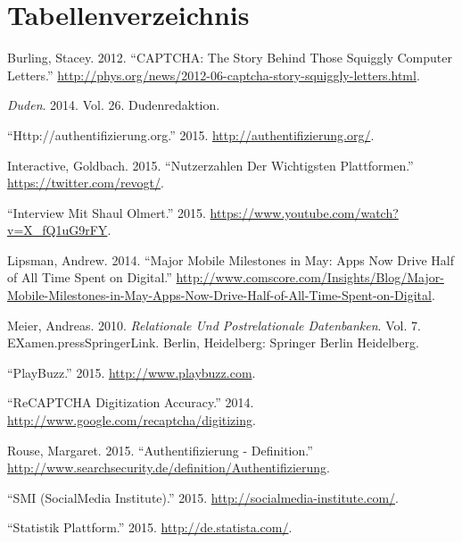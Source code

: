 \renewcommand{\bibname}{}

\begingroup \let\clearpage\relax

\endgroup

\pagebreak

\section{Tabellenverzeichnis}\label{tabellenverzeichnis}

\renewcommand{\listtablename}{} 

\begingroup \let\clearpage\relax
\listoftables
\endgroup

\hypertarget{refs}{}
\hypertarget{ref-captcha}{}
Burling, Stacey. 2012. ``CAPTCHA: The Story Behind Those Squiggly
Computer Letters.''
\url{http://phys.org/news/2012-06-captcha-story-squiggly-letters.html}.

\hypertarget{ref-duden}{}
\emph{Duden}. 2014. Vol. 26. Dudenredaktion.

\hypertarget{ref-authentifizierungsdeforg}{}
``Http://authentifizierung.org.'' 2015.
\url{http://authentifizierung.org/}.

\hypertarget{ref-goldbachsocial}{}
Interactive, Goldbach. 2015. ``Nutzerzahlen Der Wichtigsten
Plattformen.'' \url{https://twitter.com/revogt/}.

\hypertarget{ref-t3nplaybuzz}{}
``Interview Mit Shaul Olmert.'' 2015.
\url{https://www.youtube.com/watch?v=X_fQ1uG9rFY}.

\hypertarget{ref-comescore-mobiletrends}{}
Lipsman, Andrew. 2014. ``Major Mobile Milestones in May: Apps Now Drive
Half of All Time Spent on Digital.''
\url{http://www.comscore.com/Insights/Blog/Major-Mobile-Milestones-in-May-Apps-Now-Drive-Half-of-All-Time-Spent-on-Digital}.

\hypertarget{ref-rupDatenbanken}{}
Meier, Andreas. 2010. \emph{Relationale Und Postrelationale
Datenbanken}. Vol. 7. EXamen.pressSpringerLink. Berlin, Heidelberg:
Springer Berlin Heidelberg.

\hypertarget{ref-playbuzz}{}
``PlayBuzz.'' 2015. \url{http://www.playbuzz.com}.

\hypertarget{ref-googlecaptcha}{}
``ReCAPTCHA Digitization Accuracy.'' 2014.
\url{http://www.google.com/recaptcha/digitizing}.

\hypertarget{ref-authentifizierungsdef}{}
Rouse, Margaret. 2015. ``Authentifizierung - Definition.''
\url{http://www.searchsecurity.de/definition/Authentifizierung}.

\hypertarget{ref-smi}{}
``SMI (SocialMedia Institute).'' 2015.
\url{http://socialmedia-institute.com/}.

\hypertarget{ref-statista}{}
``Statistik Plattform.'' 2015. \url{http://de.statista.com/}.


